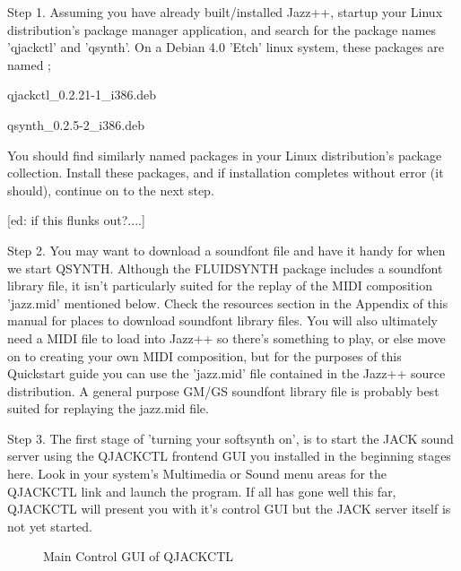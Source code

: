 \documentclass[letterpaper]{report}
\begin{document}
Step 1.  Assuming you have already built/installed Jazz++, startup
your Linux distribution's package manager application, and search
for the package names 'qjackctl' and 'qsynth'. On a Debian 4.0 'Etch'
linux system, these packages are named ;

qjackctl\_0.2.21-1\_i386.deb

qsynth\_0.2.5-2\_i386.deb

You should find similarly named packages in your Linux distribution's
package collection. Install these packages, and if installation
completes without error (it should), continue on to the next step.

[ed: if this flunks out?....]


Step 2. You may want to download a soundfont file and have it handy
for when we start QSYNTH. Although the FLUIDSYNTH package includes a
soundfont library file, it isn't particularly suited for the replay of
the MIDI composition 'jazz.mid' mentioned below. Check the resources
section in the Appendix of this manual for places to download soundfont
library files. You will also ultimately need a MIDI file to load into Jazz++
so there's something to play, or else move on to creating your own MIDI
composition, but for the purposes of this Quickstart guide you can use
the 'jazz.mid' file contained in the Jazz++ source distribution. A general
purpose GM/GS soundfont library file is probably best suited for replaying
the jazz.mid file.


Step 3. The first stage of 'turning your softsynth on', is to start the
JACK sound server using the QJACKCTL frontend GUI you installed in the
beginning stages here. Look in your system's Multimedia or Sound menu
areas for the QJACKCTL link and launch the program. If all has gone well
this far, QJACKCTL will present you with it's control GUI but the JACK
server itself is not yet started.

\begin{figure}
\caption{Main Control GUI of QJACKCTL}
\end{figure}
\end{document}
